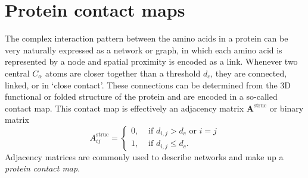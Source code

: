 \documentclass[
reprint,
twocolumn,
amsmath,amssymb,superscriptaddress,aps,
pre]{revtex4-1}
\begin{document}
\section{Protein contact maps}
\label{sec:methods}
The complex interaction pattern between the amino acids in a protein can be very naturally expressed as a network or graph, in which each amino acid is represented by a node and spatial proximity is encoded as a link. Whenever two central $C_\alpha$ atoms are closer together than a threshold $d_c$, they are connected, linked, or in `close contact'. These connections can be determined from the 3D functional or folded structure of the protein and are encoded in a so-called contact map. This contact map is effectively an adjacency matrix $\textbf{A}^{\mathrm{struc}}$ or binary matrix
\begin{equation}
  A^{\mathrm{struc}}_{ij}=
  \begin{cases}
   0, & \text{ if } d_{i,j}>d_c \text{ or } i=j\\
      1, & \text{ if } d_{i,j}\leq d_c.
      \end{cases}
    \label{eq:aij}
\end{equation}
Adjacency matrices are commonly used to describe networks and make up a \textit{protein contact map}. 
\end{document}
